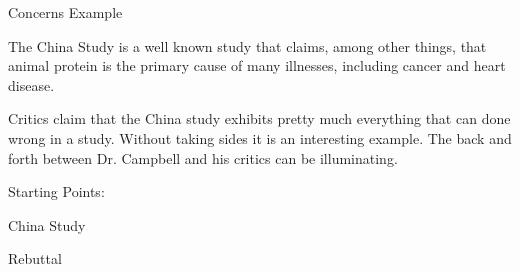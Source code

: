 \documentclass[11pt]{beamer}
\begin{document}
\begin{frame}{
	\begin{minipage}[t]{0.55\textwidth}
		Concerns Example
	\end{minipage}
	\hfill
	\begin{minipage}[t]{0.35\textwidth}
		\flushright
	\end{minipage}
}{}
The China Study is a well known study that claims, among other  things, that animal protein is the primary cause of many illnesses, including cancer and heart disease.

\vspace{0.3cm}
Critics claim that the China study exhibits pretty much everything that can done wrong in a study. Without taking sides it is an interesting example. The back and forth between Dr. Campbell and his critics can be illuminating.

\vspace{0.3cm}
Starting Points:

\vspace{0.3cm}
China Study \parencite{CampbellChinaStudy1968}

\vspace{0.3cm}
Rebuttal \parencite{WhatDrCampbell}
\end{frame}
\end{document}
